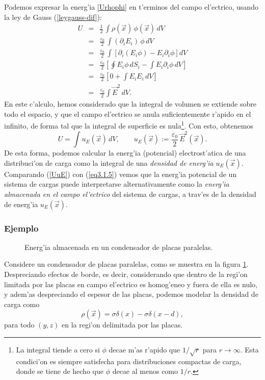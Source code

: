 Podemos expresar la energ'ia \eqref{Urhophi} en t'erminos del campo el'ectrico,
usando la ley de Gauss (\ref{leygauss-dif}):
\begin{eqnarray}
U&=&\frac{1}{2}\,\int\rho(\vec{x})\,\phi(\vec{x})\,dV \\
&=&\frac{\varepsilon_0}{2}\,\int(\partial_i E_i)\,\phi\,dV\\
&=&\frac{\varepsilon_0}{2}\,\int\left[
\partial_i(E_i\phi)-E_i\partial_i\phi\right] dV\\
&=&\frac{\varepsilon_0}{2}\left[\oint
E_i\phi\,dS_i-\int E_i\partial_i\phi\, dV\right]\\
&=&\frac{\varepsilon_0}{2}\left[0+\int E_iE_i\, dV\right]\\
&=&\frac{\varepsilon_0}{2}\int \vec{E}^2\, dV.
\end{eqnarray}
En este c'alculo, hemos considerado que la integral de volumen se extiende sobre
todo el espacio, y que el campo el'ectrico se anula suficientemente r'apido en
el infinito, de forma tal que la integral de superficie es nula\footnote{La integral tiende a cero si $\phi$ decae m'as r'apido que $1/\sqrt{r}$ para $r\to\infty$. Esta condici'on es siempre satisfecha para distribuciones compactas de carga, donde se tiene de hecho que $\phi$ decae al menos como $1/r$.}. Con esto,
obtenemos
\begin{equation} \label{UuE}
\boxed{U=\int u_E(\vec{x})\,dV, \qquad u_E(\vec{x}):=\frac{\varepsilon_0}{2}\,
\vec{E}^2(\vec{x}) .}
\end{equation}
De esta forma, podemos calcular la energ'ia (potencial) electrost'atica de una
distribuci'on de carga como la integral de una \textit{densidad de energ'ia}
$u_E(\vec{x})$. Comparando (\ref{UuE}) con (\ref{eq3.1.5}) vemos que la
energ'ia potencial de un sistema de cargas puede interpretarse alternativamente
como la \textit{energ'ia almacenada en el campo el'ectrico} del sistema de
cargas, a trav'es de la densidad de energ'ia $u_E(\vec{x})$.

\subsubsection{Ejemplo}
\begin{figure}[!h]
\centerline{ }
\caption{Energ'ia almacenada en un condensador de placas paralelas.}
\label{fig:cpp}
\end{figure}
Considere un condensador de placas paralelas, como se muestra en la figura \ref{fig:cpp}. Despreciando efectos de borde, es decir, considerando que dentro de la regi'on limitada por las placas en campo el'ectrico es homog'eneo y fuera de ella es nulo, y adem'as despreciando el espesor de las placas, podemos modelar la densidad de carga como
\begin{equation}
\rho(\vec{x})=\sigma\delta(x)-\sigma\delta(x-d), 
\end{equation}
para todo $(y,z)$ en la regi'on delimitada por las placas. 

